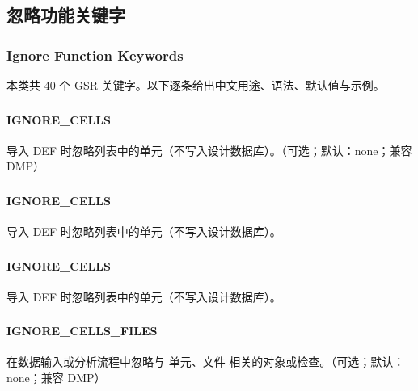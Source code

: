 \subsection{忽略功能关键字}
\subsubsection*{Ignore Function Keywords}

本类共 40 个 GSR 关键字。以下逐条给出中文用途、语法、默认值与示例。

\subsubsection{}
\paragraph*{IGNORE_CELLS}

导入 DEF 时忽略列表中的单元（不写入设计数据库）。（可选；默认：none；兼容 DMP）

\subsubsection{}
\paragraph*{IGNORE_CELLS}

导入 DEF 时忽略列表中的单元（不写入设计数据库）。

\subsubsection{}
\paragraph*{IGNORE_CELLS}

导入 DEF 时忽略列表中的单元（不写入设计数据库）。

\subsubsection{}
\paragraph*{IGNORE_CELLS_FILES}

在数据输入或分析流程中忽略与 单元、文件 相关的对象或检查。（可选；默认：none；兼容 DMP）

